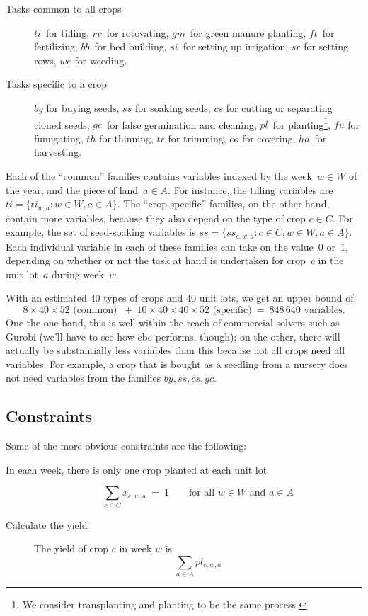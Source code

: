 \documentclass[11pt]{amsart}
\begin{document}
\begin{description}
\item[Tasks common to all crops]  $ti$~for tilling, $rv$~for
  rotovating, $gm$~for green manure planting, $ft$~for fertilizing,
  $bb$~for bed building, $si$~for setting up irrigation, $sr$ for
  setting rows, $we$ for weeding.

\smallskip
\item[Tasks specific to a crop] $by$ for buying seeds, $ss$ for
  soaking seeds, $cs$ for cutting or separating cloned seeds, $gc$~for
  false germination and cleaning, $pl$~for planting\footnote{We
    consider transplanting and planting to be the same process.},
  $f\!u$ for fumigating, $th$ for thinning, $tr$ for trimming, $co$
  for covering, $ha$~for harvesting.
\end{description}

Each of the ``common'' families contains variables indexed by the
week~$w\in W$ of the year, and the piece of land~$a\in A$. For
instance, the tilling variables are $ti=\{ti_{w,a}:w\in W, a\in
A\}$. The ``crop-specific'' families, on the other hand, contain more
variables, because they also depend on the type of crop $c\in C$. For
example, the set of seed-soaking variables is $ss=\{ss_{c,w,a} : c\in
C, w\in W, a\in A\}$. Each individual variable in each of these
families can take on the value~$0$ or~$1$, depending on whether or not
the task at hand is undertaken for crop~$c$ in the unit lot~$a$
during week~$w$.

With an estimated $40$ types of crops and $40$ unit lots, we get an
upper bound of
\[
   8\times 40\times 52 \text{ (common) }
   \ + \ 
   10\times 40\times 40\times 52 \text{ (specific)}
   \ = \ 
   848\,640 \text{ variables.}
\]
One the one hand, this is well within the reach of commercial solvers
such as Gurobi (we'll have to see how cbc performs, though); on the
other, there will actually be substantially less variables than this
because not all crops need all variables. For example, a crop that is
bought as a seedling from a nursery does not need variables from the
families $by, ss, cs, gc$.

\subsection{Constraints}

Some of the more obvious constraints are the following:

\begin{description}
\item[In each week, there is only one crop planted at each unit lot] 
\[
   \sum_{c\in C} x_{c,w,a} \ = \ 1
   \qquad\text{for all } w\in W \text{ and } a\in A
\]

\item[Calculate the yield] The yield of crop $c$ in week $w$ is
\[
   \sum_{a\in A} pl_{c,w,a}
\]
\end{description}
\end{document}
